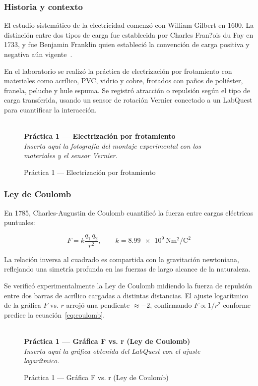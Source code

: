 \documentclass[12pt, a4paper]{article}
\newcommand{\figplaceholder}[2]{%
  \begin{figure}[H]
    \centering
    \begin{tcolorbox}[
      colback=white, colframe=gray!40,
      width=0.9\linewidth,
      halign=center, valign=center,
      height=4.5cm,
      enhanced, sharp corners,
      borderline={0.5pt}{0pt}{gray!40, dashed}
    ]
      \centering
      \textcolor{gray!60}{\Large } \\[4pt]
      \textbf{\textcolor{gray!70}{#1}} \\[2pt]
      \textit{\small\textcolor{gray!60}{#2}}
    \end{tcolorbox}
    \caption{#1}
    \label{fig:#1}
  \end{figure}%
}
\begin{document}
\subsubsection{Historia y contexto}

El estudio sistemático de la electricidad comenzó con William Gilbert en
1600. La distinción entre dos tipos de carga fue establecida por Charles
Fran?ois du Fay en 1733, y fue Benjamin Franklin quien estableció la
convención de carga positiva y negativa aún vigente~\cite{griffiths2017}.

\begin{cajaclas}
En el laboratorio se realizó la práctica de electrización por frotamiento
con materiales como acrílico, PVC, vidrio y cobre, frotados con paños de
poliéster, franela, peluche y hule espuma. Se registró atracción o
repulsión según el tipo de carga transferida, usando un sensor de rotación
Vernier conectado a un LabQuest para cuantificar la interacción.
\end{cajaclas}

\figplaceholder{Práctica 1 --- Electrización por frotamiento}
{Inserta aquí la fotografía del montaje experimental con los materiales y el sensor Vernier.}

\subsubsection{Ley de Coulomb}

En 1785, Charles-Augustin de Coulomb cuantificó la fuerza entre cargas
eléctricas puntuales:

\begin{equation}
  F = k \frac{q_1\, q_2}{r^2}, \qquad
  k = \SI{8.99e9}{\newton\metre\squared\per\coulomb\squared}
  \label{eq:coulomb}
\end{equation}

La relación inversa al cuadrado es compartida con la gravitación
newtoniana, reflejando una simetría profunda en las fuerzas de largo
alcance de la naturaleza.

\begin{cajaclas}
Se verificó experimentalmente la Ley de Coulomb midiendo la fuerza de
repulsión entre dos barras de acrílico cargadas a distintas distancias. El
ajuste logarítmico de la gráfica $F$ vs. $r$ arrojó una pendiente $\approx
-2$, confirmando $F \propto 1/r^2$ conforme predice la
ecuación~\eqref{eq:coulomb}.
\end{cajaclas}

\figplaceholder{Práctica 1 --- Gráfica F vs. r (Ley de Coulomb)}
{Inserta aquí la gráfica obtenida del LabQuest con el ajuste logarítmico.}
\end{document}
